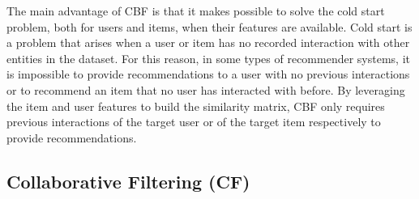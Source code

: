 The main advantage of CBF is that it makes possible to solve the cold start problem, both for users and items, when their features are available. Cold start is a problem that arises when a user or item has no recorded interaction with other entities in the dataset. For this reason, in some types of recommender systems, it is impossible to provide recommendations to a user with no previous interactions or to recommend an item that no user has interacted with before. By leveraging the item and user features to build the similarity matrix, CBF only requires previous interactions of the target user or of the target item respectively to provide recommendations.


\subsection{Collaborative Filtering (CF)}

